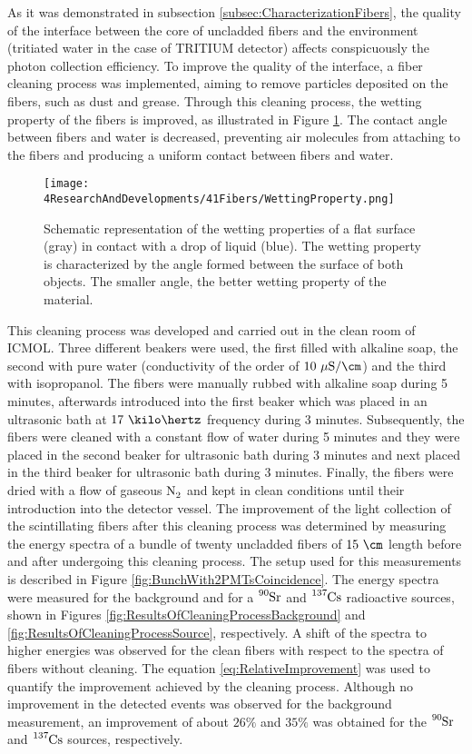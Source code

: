 
As it was demonstrated in subsection \ref{subsec:CharacterizationFibers}, the quality of the interface between the core of uncladded fibers and the environment (tritiated water in the case of TRITIUM detector) affects conspicuously the photon collection efficiency. To improve the quality of the interface, a fiber cleaning process was implemented, aiming to remove particles deposited on the fibers, such as dust and grease.  Through this cleaning process, the wetting property of the fibers is improved, as illustrated in Figure \ref{fig:WettingProperty}. The contact angle between fibers and water is decreased, preventing air molecules from attaching to the fibers and producing a uniform contact between fibers and water.
\begin{figure}[h]
\centering
\texttt{[image: 4ResearchAndDevelopments/41Fibers/WettingProperty.png]}
\caption{Schematic representation of the wetting properties of a flat surface (gray) in contact with a drop of liquid (blue). The wetting property is characterized by the angle formed between the surface of both objects. The smaller angle, the better wetting property of the material. \cite{WettingProperty}\label{fig:WettingProperty}}
\end{figure}
This cleaning process  was developed and carried out in the clean room of ICMOL. Three different beakers were used, the first filled with alkaline soap, the second with pure water (conductivity of the order of $10~\mu\text{S}/\cm$) and the third with isopropanol. The fibers were manually rubbed with alkaline soap during 5 minutes, afterwards introduced into the first beaker which was placed in an ultrasonic bath at $17~\kilo\hertz$ frequency during 3 minutes. Subsequently, the fibers were cleaned with a constant flow of water during 5 minutes and they were placed in the second beaker for ultrasonic bath during 3 minutes and next placed in the third beaker for ultrasonic bath during 3 minutes. Finally, the fibers were dried with a flow of gaseous $\ce{N_2}$ and kept in clean conditions until their introduction into the detector vessel. The improvement of the light collection of the scintillating fibers after this cleaning process was determined by measuring the energy spectra of a bundle of twenty uncladded fibers of $15~\cm$ length before and after undergoing this cleaning process. The setup used for this measurements is described in Figure \ref{fig:BunchWith2PMTsCoincidence}. The energy spectra were measured for the background and for a $\ce{^{90}Sr}$ and $\ce{^{137}Cs}$ radioactive sources, shown in Figures \ref{fig:ResultsOfCleaningProcessBackground} and \ref{fig:ResultsOfCleaningProcessSource}, respectively. A shift of the spectra to higher energies was observed for the clean fibers with respect to the spectra of fibers without cleaning. The equation \ref{eq:RelativeImprovement} was used to quantify the improvement achieved by the cleaning process. Although no improvement in the detected events was observed for the background measurement, an improvement of about $26\%$ and $35\%$ was obtained for the $\ce{^{90}Sr}$ and $\ce{^{137}Cs}$ sources, respectively.

